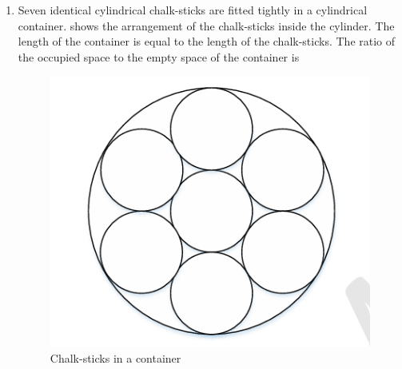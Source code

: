 \documentclass[journal,12pt,onecolumn]{IEEEtran}
\theoremstyle{remark}
\begin{document}
\begin{enumerate}
\item Seven identical cylindrical chalk-sticks are fitted tightly in a cylindrical container.  shows the arrangement of the chalk-sticks inside the cylinder. The length of the container is equal to the length of the chalk-sticks. The ratio of the occupied space to the empty space of the container is
\par\hfill{}
\begin{figure}[H]
    \centering
    \includegraphics[width=0.3\columnwidth]{Figs/Q-7.png}
    \caption{Chalk-sticks in a container}
    \label{7}
\end{figure}
    \begin{enumerate}
    \end{enumerate}


\end{enumerate}
\end{document}
